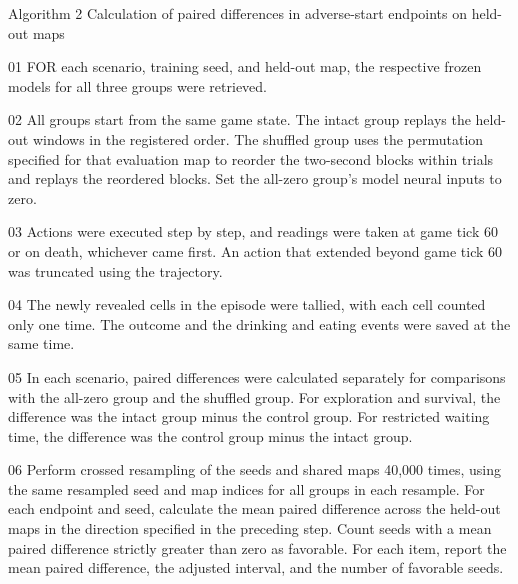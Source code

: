 \documentclass{article}
\begin{document}
Algorithm 2 Calculation of paired differences in adverse-start endpoints on held-out maps


01 FOR each scenario, training seed, and held-out map, the respective frozen models for all three groups were retrieved.


02 All groups start from the same game state. The intact group replays the held-out windows in the registered order. The shuffled group uses the permutation specified for that evaluation map to reorder the two-second blocks within trials and replays the reordered blocks. Set the all-zero group's model neural inputs to zero.


03 Actions were executed step by step, and readings were taken at game tick 60 or on death, whichever came first. An action that extended beyond game tick 60 was truncated using the trajectory.


04 The newly revealed cells in the episode were tallied, with each cell counted only one time. The outcome and the drinking and eating events were saved at the same time.


05 In each scenario, paired differences were calculated separately for comparisons with the all-zero group and the shuffled group. For exploration and survival, the difference was the intact group minus the control group. For restricted waiting time, the difference was the control group minus the intact group.


06 Perform crossed resampling of the seeds and shared maps 40,000 times, using the same resampled seed and map indices for all groups in each resample. For each endpoint and seed, calculate the mean paired difference across the held-out maps in the direction specified in the preceding step. Count seeds with a mean paired difference strictly greater than zero as favorable. For each item, report the mean paired difference, the adjusted interval, and the number of favorable seeds.
\end{document}
